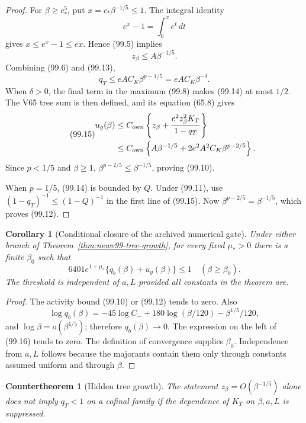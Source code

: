 \documentclass[11pt,oneside]{article}
\newtheorem{corollary}[theorem]{Corollary}
\newtheorem{countertheorem}[theorem]{Countertheorem}
\theoremstyle{definition}
\theoremstyle{remark}
\begin{document}
\begin{proof}
For \(\beta\ge c_*^5\), put
\(x=c_*\beta^{-1/5}\le1\).  The integral identity
\[
 e^x-1=\int_0^x e^t\,dt
\]
gives \(x\le e^x-1\le ex\).  Hence (99.5) implies
\[
 z_\beta\le A\beta^{-1/5}.                          \tag{99.13}
\]
Combining (99.6) and (99.13),
\[
 q_T\le eAC_K\beta^{p-1/5}
      =eAC_K\beta^{-\delta}.                        \tag{99.14}
\]
When \(\delta>0\), the final term in the maximum (99.8) makes
(99.14) at most \(1/2\).  The V65 tree sum is then defined, and its
equation (65.8) gives
\begin{equation*}
\tag{99.15}
\begin{split}
 u_g(\beta)
 &\le C_{\rm own}\left\{
 z_\beta+\frac{e^2z_\beta^2K_T}{1-q_T}\right\}\\
 &\le C_{\rm own}\left\{
 A\beta^{-1/5}
 +2e^2A^2C_K\beta^{p-2/5}\right\}.
\end{split}
\end{equation*}
Since \(p<1/5\) and \(\beta\ge1\),
\(\beta^{p-2/5}\le\beta^{-1/5}\), proving (99.10).

When \(p=1/5\), (99.14) is bounded by \(Q\).  Under (99.11), use
\((1-q_T)^{-1}\le(1-Q)^{-1}\) in the first line of
(99.15).  Now \(\beta^{p-2/5}=\beta^{-1/5}\), which proves
(99.12).
\end{proof}

\begin{corollary}[Conditional closure of the archived numerical gate]
\label{cor:newv99-numerical-gate}
Under either branch of
Theorem~\ref{thm:newv99-tree-growth}, for every fixed
\(\mu_*>0\) there is a finite \(\beta_0\) such that
\[
 6401e^{1+\mu_*}\{q_b(\beta)+u_g(\beta)\}\le1
 \quad(\beta\ge\beta_0).                            \tag{99.16}
\]
The threshold is independent of \(a,L\) provided all constants in
the theorem are.
\end{corollary}

\begin{proof}
The activity bound (99.10) or (99.12) tends to zero.  Also
\[
 \log q_b(\beta)=
 -45\log C_-+180\log(\beta/120)-\beta^{1/5}/120,     \tag{99.17}
\]
and \(\log\beta=o(\beta^{1/5})\); therefore
\(q_b(\beta)\to0\).  The expression on the left of (99.16) tends
to zero.  The definition of convergence supplies \(\beta_0\).
Independence from \(a,L\) follows because the majorants contain
them only through constants assumed uniform and through \(\beta\).
\end{proof}

\begin{countertheorem}[Hidden tree growth]
\label{ctr:newv99-hidden-growth}
The statement \(z_\beta=O(\beta^{-1/5})\) alone does not imply
\(q_T<1\) on a cofinal family if the dependence of \(K_T\) on
\(\beta,a,L\) is suppressed.
\end{countertheorem}
\end{document}
